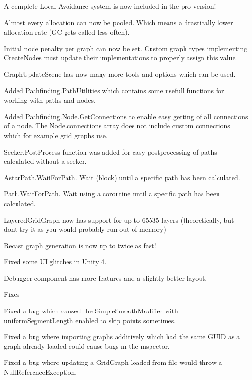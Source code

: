 \begin{DoxyItemize}
\begin{DoxyItemize}
\begin{DoxyItemize}
\item A complete Local Avoidance system is now included in the pro version!
\item Almost every allocation can now be pooled. Which means a drastically lower allocation rate (GC get\textquotesingle{}s called less often).
\item Initial node penalty per graph can now be set. Custom graph types implementing Create\+Nodes must update their implementations to properly assign this value.
\item Graph\+Update\+Scene has now many more tools and options which can be used.
\item Added Pathfinding.\+Path\+Utilities which contains some usefull functions for working with paths and nodes.
\item Added Pathfinding.\+Node.\+Get\+Connections to enable easy getting of all connections of a node. The Node.\+connections array does not include custom connections which for example grid graphs use.
\item Seeker.\+Post\+Process function was added for easy postprocessing of paths calculated without a seeker.
\item \mbox{\hyperlink{class_astar_path_ac46f3c7ee27f7e587a00f549a9a7118d}{Astar\+Path.\+Wait\+For\+Path}}. Wait (block) until a specific path has been calculated.
\item Path.\+Wait\+For\+Path. Wait using a coroutine until a specific path has been calculated.
\item Layered\+Grid\+Graph now has support for up to 65535 layers (theoretically, but don\textquotesingle{}t try it as you would probably run out of memory)
\item Recast graph generation is now up to twice as fast!
\item Fixed some UI glitches in Unity 4.
\item Debugger component has more features and a slightly better layout.
\end{DoxyItemize}
\item Fixes
\begin{DoxyItemize}
\item Fixed a bug which caused the Simple\+Smooth\+Modifier with uniform\+Segment\+Length enabled to skip points sometimes.
\item Fixed a bug where importing graphs additively which had the same G\+U\+ID as a graph already loaded could cause bugs in the inspector.
\item Fixed a bug where updating a Grid\+Graph loaded from file would throw a Null\+Reference\+Exception.

\end{DoxyItemize}
\end{DoxyItemize}
\end{DoxyItemize}

